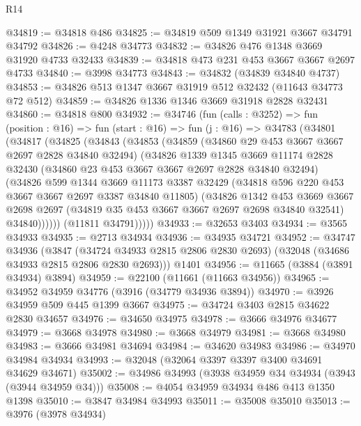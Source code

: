\begin{lexlean}{R14}
\begin{coremodule}
@34819 := @34818 @486
@34825 := @34819 @509 @1349 @31921 @3667 @34791 @34792
@34826 := @4248 @34773
@34832 := @34826 @476 @1348 @3669 @31920 @4733 @32433
@34839 := @34818 @473 @231 @453 @3667 @3667 @2697 @4733
@34840 := @3998 @34773
@34843 := @34832 (@34839 @34840 @4737)
@34853 := @34826 @513 @1347 @3667 @31919 @512 @32432 (@11643 @34773 @72 @512)
@34859 := @34826 @1336 @1346 @3669 @31918 @2828 @32431
@34860 := @34818 @800
@34932 := @34746
    (fun (calls : @3252) =>
    fun (position : @16) =>
    fun (start : @16) =>
    fun (j : @16) =>
    @34783
      (@34801
        (@34817
          (@34825
            (@34843
              (@34853
                (@34859
                  (@34860 @29 @453 @3667 @3667 @2697 @2828 @34840 @32494)
                  (@34826
                    @1339
                    @1345
                    @3669
                    @11174
                    @2828
                    @32430
                    (@34860 @23 @453 @3667 @3667 @2697 @2828 @34840 @32494)
                    (@34826
                      @599
                      @1344
                      @3669
                      @11173
                      @3387
                      @32429
                      (@34818 @596 @220 @453 @3667 @3667 @2697 @3387 @34840 @11805)
                      (@34826
                        @1342
                        @453
                        @3669
                        @3667
                        @2698
                        @2697
                        (@34819 @35 @453 @3667 @3667 @2697 @2698 @34840 @32541)
                        @34840))))))
            (@11811 @34791)))))
@34933 := @32653 @3403
@34934 := @3565 @34933
@34935 := @2713 @34934
@34936 := @34935 @34721
@34952 := @34747
    @34936
    (@3847 (@34724 @34933 @2815 @2806 @2830 @2693) (@32048 (@34686 @34933 @2815 @2806 @2830 @2693)))
    @1401
@34956 := @11665 (@3884 (@3891 @34934) @3894)
@34959 := @22100 (@11661 (@11663 @34956))
@34965 := @34952 @34959 @34776 (@3916 (@34779 @34936 @3894))
@34970 := @3926 @34959 @509 @445 @1399 @3667
@34975 := @34724 @3403 @2815 @34622 @2830 @34657
@34976 := @34650 @34975
@34978 := @3666 @34976 @34677
@34979 := @3668 @34978
@34980 := @3668 @34979
@34981 := @3668 @34980
@34983 := @3666 @34981 @34694
@34984 := @34620 @34983
@34986 := @34970 @34984 @34934
@34993 := @32048 (@32064 @3397 @3397 @3400 @34691 @34629 @34671)
@35002 := @34986 @34993 (@3938 @34959 @34 @34934 (@3943 (@3944 @34959 @34)))
@35008 := @4054 @34959 @34934 @486 @413 @1350 @1398
@35010 := @3847 @34984 @34993
@35011 := @35008 @35010
@35013 := @3976 (@3978 @34934)

\end{coremodule}
\end{lexlean}
